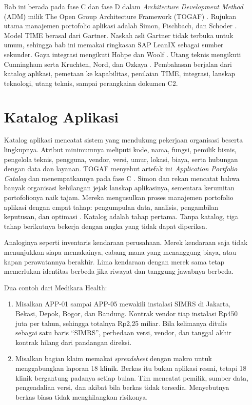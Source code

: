 Bab ini berada pada fase C dan fase D dalam \textit{Architecture Development Method} (ADM)
milik The Open Group Architecture Framework (TOGAF) \cite{togaf10}. Rujukan utama manajemen
portofolio aplikasi adalah Simon, Fischbach, dan Schoder \cite{c07-simon2010}. Model TIME
berasal dari Gartner. Naskah asli Gartner tidak terbuka untuk umum, sehingga bab ini memakai
ringkasan SAP LeanIX \cite{c07-sheppard2023} sebagai sumber sekunder. Gaya integrasi mengikuti
Hohpe dan Woolf \cite{hohpe2003}. Utang teknis mengikuti Cunningham serta Kruchten, Nord,
dan Ozkaya \cite{c07-cunningham1992,c07-kruchten2012}. Pembahasan berjalan dari katalog
aplikasi, pemetaan ke kapabilitas, penilaian TIME, integrasi, lanskap teknologi, utang teknis,
sampai perangkaian dokumen C2.

\section{Katalog Aplikasi}

Katalog aplikasi mencatat sistem yang mendukung pekerjaan organisasi beserta lingkupnya.
Atribut minimumnya meliputi kode, nama, fungsi, pemilik bisnis, pengelola teknis, pengguna,
vendor, versi, umur, lokasi, biaya, serta hubungan dengan data dan layanan. TOGAF menyebut
artefak ini \textit{Application Portfolio Catalog} dan menempatkannya pada fase C
\cite{togaf10}. Simon dan rekan mencatat bahwa banyak organisasi kehilangan jejak lanskap
aplikasinya, sementara kerumitan portofolionya naik tajam. Mereka mengusulkan proses
manajemen portofolio aplikasi dengan empat tahap: pengumpulan data, analisis, pengambilan
keputusan, dan optimasi \cite{c07-simon2010}. Katalog adalah tahap pertama. Tanpa katalog,
tiga tahap berikutnya bekerja dengan angka yang tidak dapat diperiksa.

Analoginya seperti inventaris kendaraan perusahaan. Merek kendaraan saja tidak menunjukkan
siapa memakainya, cabang mana yang menanggung biaya, atau kapan perawatannya berakhir. Lima
kendaraan dengan merek sama tetap memerlukan identitas berbeda jika riwayat dan tanggung
jawabnya berbeda.

Dua contoh dari Medikara Health:

\begin{enumerate}
  \item Misalkan APP-01 sampai APP-05 mewakili instalasi SIMRS di Jakarta, Bekasi, Depok, Bogor,
        dan Bandung. Kontrak vendor tiap instalasi Rp450 juta per tahun, sehingga totalnya
        Rp2,25 miliar. Bila kelimanya ditulis sebagai satu baris ``SIMRS'', perbedaan versi,
        vendor, dan tanggal akhir kontrak hilang dari pandangan direksi.
  \item Misalkan bagian klaim memakai \textit{spreadsheet} dengan makro untuk menggabungkan
        laporan 18 klinik. Berkas itu bukan aplikasi resmi, tetapi 18 klinik bergantung padanya
        setiap bulan. Tim mencatat pemilik, sumber data, pengendalian versi, dan akibat bila
        berkas tidak tersedia. Menyebutnya berkas biasa tidak menghilangkan risikonya.
\end{enumerate}

